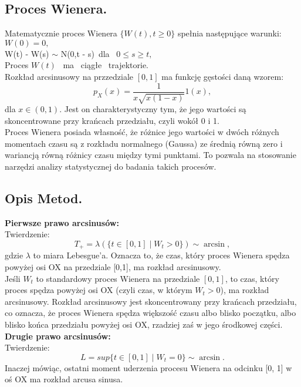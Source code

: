 \documentclass[12pt,letterpaper]{article}
\theoremstyle{definition}
\begin{document}
\subsection{Proces Wienera.}
Matematycznie proces Wienera $\{ W(t),t\geq 0 \}$ spełnia następujące warunki:\\

$W(0)=0,$\\
W(t) - W(s) $\sim$ N(0,t - s)\  dla \ $0\leq s \geq t,$\\
Proces $ W(t)$ \ ma \ ciągłe \ trajektorie.\\

Rozkład arcsinusowy na przzedziale $[0,1]$ ma funkcję gęstości daną wzorem:
$$p_X(x)=\frac{1}{x\sqrt{x(1-x)}}  \mathit{1} (x) ,$$
dla $x \in (0,1).$ Jest on charakterystyczny tym, że jego wartości są skoncentrowane przy krańcach przedziału, czyli wokół 0 i 1.\\

 Proces Wienera posiada własność, że różnice jego wartości w dwóch różnych momentach czasu są z rozkładu normalnego (Gaussa) ze średnią równą zero i wariancją równą różnicy czasu między tymi punktami. To pozwala na stosowanie narzędzi analizy statystycznej do badania takich procesów.

\subsection{Opis Metod.}
\textbf{Pierwsze prawo arcsinusów:}\\

Twierdzenie:\\
$$T_+= \lambda ( \{t\in [0,1] \mid W_t>0 \})\sim \arcsin,$$
gdzie $\lambda$ to miara Lebesgue’a. Oznacza to, że czas, który proces Wienera spędza powyżej osi OX na przedziale 
[0,1], ma rozkład arcsinusowy.\\

Jeśli $W_t$ to standardowy proces Wienera na przedziale $[0,1]$, to czas, który proces spędza powyżej osi OX (czyli czas, w którym $W_t>0$), ma rozkład arcsinusowy. Rozkład arcsinusowy jest skoncentrowany przy krańcach przedziału, co oznacza, że proces Wienera spędza większość czasu albo blisko początku, albo blisko końca przedziału powyżej osi OX, rzadziej zaś w jego środkowej części.\\


\textbf{Drugie prawo arcsinusów:}\\


Twierdzenie:\\
$$L = sup\{t \in [0, 1]\mid W_t = 0\} \sim \arcsin.$$ Inaczej mówiąc, ostatni moment uderzenia procesu Wienera na odcinku [0, 1] w oś OX ma rozkład arcusa sinusa.\\
\end{document}
